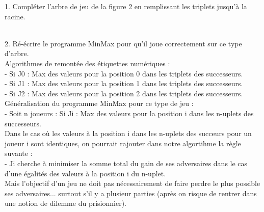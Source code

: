 \documentclass[12pt,a4paper, france]{article}
\newcommand\tab[1][1cm]{\hspace*{#1}}
\begin{document}
1. Compl\'eter l’arbre de jeu de la figure 2 en remplissant les triplets jusqu\textquoteright \`a la racine.\\

 \\ [5mm]

2. R\'e-\'ecrire le programme MinMax pour qu\textquoteright il joue correctement sur ce type d\textquoteright arbre. \\

Algorithmes de remont\'ee des \'etiquettes num\'eriques : \\
\tab \tab - Si J0 : Max des valeurs pour la position 0 dans les triplets des successeurs.\\
\tab \tab - Si J1 : Max des valeurs pour la position 1 dans les triplets des successeurs.\\
\tab \tab - Si J2 : Max des valeurs pour la position 2 dans les triplets des successeurs.\\

G\'en\'eralisation du programme MinMax pour ce type de jeu : \\
- Soit n joueurs : Si Ji : Max des valeurs pour la position i dans les n-uplets des successeurs.\\

Dans le cas o\`u les valeurs \`a la position i dans les n-uplets des succeurs pour un joueur i sont identiques, on pourrait rajouter dans notre algortihme la r\`egle suvante : \\
- Ji cherche \`a minimiser la somme total du gain de ses adversaires dans le cas d\textquoteright une \'egalit\'es des valeurs \`a la position i du n-uplet. \\

Mais l\textquoteright objectif d\textquoteright un jeu ne doit pas n\'ecessairement de faire perdre le plus possible ses adversaires... surtout s\textquoteright il y a plusieur parties (apr\`es on risque de rentrer dans une notion de dilemme du prisionnier).
\end{document}
